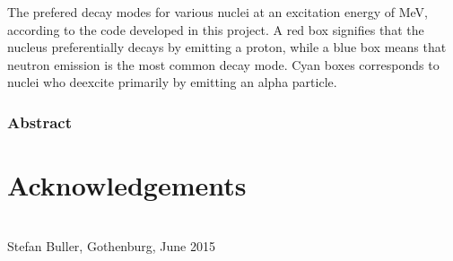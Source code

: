 \vfill
{} The prefered decay modes for various nuclei at an excitation energy of \unit[15]{MeV}, according to the code developed in this project. A red box signifies that the nucleus preferentially decays by emitting a proton, while a blue box means that neutron emission is the most common decay mode. Cyan boxes corresponds to nuclei who deexcite primarily by emitting an alpha particle.
\clearpage
\subsection*{\centering Abstract}
{\fontsize{10}{11}\selectfont 
}

\thispagestyle{empty}

\chapter*{Acknowledgements}
%

\\[1cm]

\hfill Stefan Buller, Gothenburg, June 2015
\clearpage
{}

